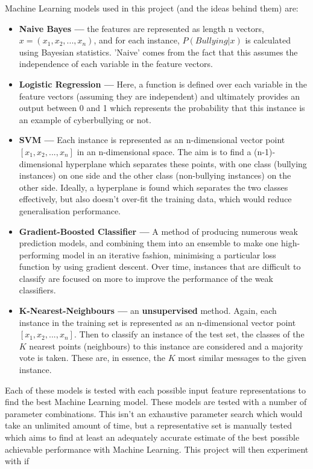 \documentclass[12pt,a4paper]{article}
\begin{document}
Machine Learning models used in this project (and the ideas behind them) are:
\begin{itemize}
	\item \textbf{Naive Bayes ---} the features are represented as length n vectors, $x=(x_1,x_2,...,x_n)$, and for each instance, $P(Bullying | x)$ is calculated using Bayesian statistics. 'Naive' comes from the fact that this assumes the independence of each variable in the feature vectors.
	\item \textbf{Logistic Regression ---} Here, a function is defined over each variable in the feature vectors (assuming they are independent) and ultimately provides an output between 0 and 1 which represents the probability that this instance is an example of cyberbullying or not. 
	\item \textbf{SVM ---} Each instance is represented as an n-dimensional vector point $[x_1,x_2,...,x_n]$ in an n-dimensional space. The aim is to find a (n-1)-dimensional hyperplane which separates these points, with one class (bullying instances) on one side and the other class (non-bullying instances) on the other side. Ideally, a hyperplane is found which separates the two classes effectively, but also doesn't over-fit the training data, which would reduce generalisation performance.
	\item \textbf{Gradient-Boosted Classifier --- } A method of producing numerous weak prediction models, and combining them into an ensemble to make one high-performing model in an iterative fashion, minimising a particular loss function by using gradient descent. Over time, instances that are difficult to classify are focused on more to improve the performance of the weak classifiers.
	\item \textbf{K-Nearest-Neighbours ---} an \textbf{unsupervised} method. Again, each instance in the training set is represented as an n-dimensional vector point $[x_1,x_2,...,x_n]$. Then to classify an instance of the test set, the classes of the $K$ nearest points (neighbours) to this instance are considered and a majority vote is taken. These are, in essence, the $K$ most similar messages to the given instance.
\end{itemize}
Each of these models is tested with each possible input feature representations to find the best Machine Learning model. These models are tested with a number of parameter combinations. This isn't an exhaustive parameter search which would take an unlimited amount of time, but a representative set is manually tested which aims to find at least an adequately accurate estimate of the best possible achievable performance with Machine Learning. This project will then experiment with if 
\end{document}
